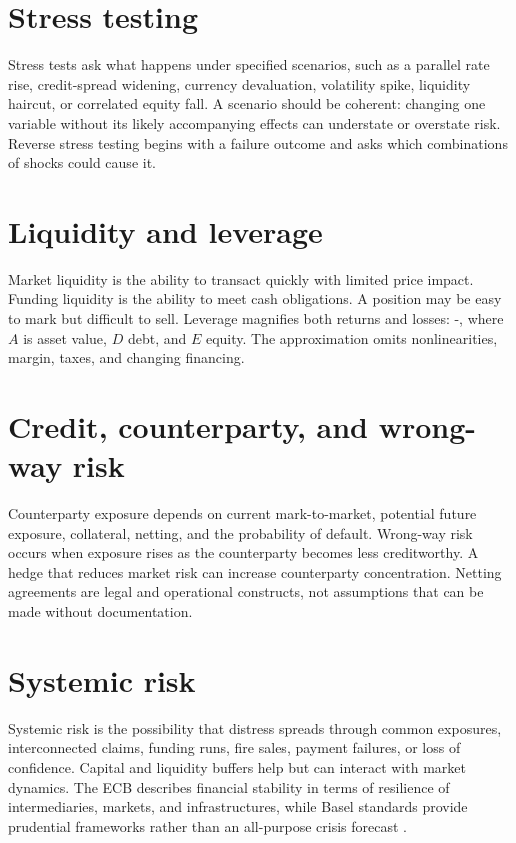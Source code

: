 \section{Stress testing}
Stress tests ask what happens under specified scenarios, such as a parallel rate rise, credit-spread widening, currency devaluation, volatility spike, liquidity haircut, or correlated equity fall. A scenario should be coherent: changing one variable without its likely accompanying effects can understate or overstate risk. Reverse stress testing begins with a failure outcome and asks which combinations of shocks could cause it.

\section{Liquidity and leverage}
Market liquidity is the ability to transact quickly with limited price impact. Funding liquidity is the ability to meet cash obligations. A position may be easy to mark but difficult to sell. Leverage magnifies both returns and losses:
  \approx{}-,
\closeformula
where $A$ is asset value, $D$ debt, and $E$ equity. The approximation omits nonlinearities, margin, taxes, and changing financing.

\section{Credit, counterparty, and wrong-way risk}
Counterparty exposure depends on current mark-to-market, potential future exposure, collateral, netting, and the probability of default. Wrong-way risk occurs when exposure rises as the counterparty becomes less creditworthy. A hedge that reduces market risk can increase counterparty concentration. Netting agreements are legal and operational constructs, not assumptions that can be made without documentation.

\section{Systemic risk}
Systemic risk is the possibility that distress spreads through common exposures, interconnected claims, funding runs, fire sales, payment failures, or loss of confidence. Capital and liquidity buffers help but can interact with market dynamics. The ECB describes financial stability in terms of resilience of intermediaries, markets, and infrastructures, while Basel standards provide prudential frameworks rather than an all-purpose crisis forecast \cite{ecb2026,basel2019}.

